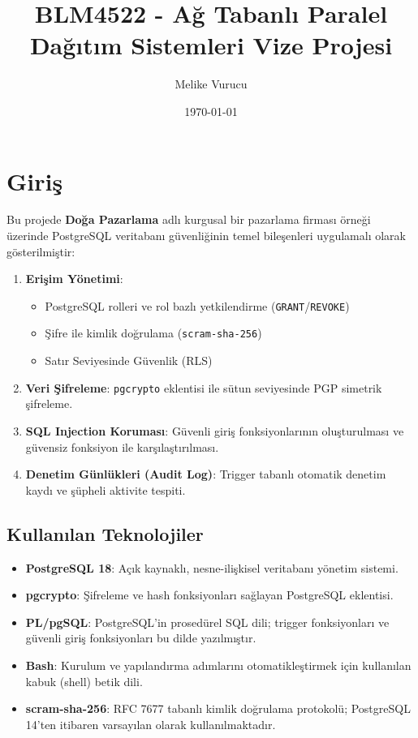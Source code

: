 \documentclass[12pt, a4paper]{report}
\title{BLM4522 - Ağ Tabanlı Paralel Dağıtım Sistemleri Vize Projesi}
\author{Melike Vurucu}
\date{\today}
\begin{document}
\maketitle
\tableofcontents

\chapter{Giriş}

Bu projede \textbf{Doğa Pazarlama} adlı kurgusal bir pazarlama firması örneği üzerinde PostgreSQL veritabanı güvenliğinin temel bileşenleri uygulamalı olarak gösterilmiştir:

\begin{enumerate}
  \item \textbf{Erişim Yönetimi}:
    \begin{itemize}
      \item PostgreSQL rolleri ve rol bazlı yetkilendirme (\texttt{GRANT}/\texttt{REVOKE})
      \item Şifre ile kimlik doğrulama (\texttt{scram-sha-256})
      \item Satır Seviyesinde Güvenlik (RLS)
    \end{itemize}
  \item \textbf{Veri Şifreleme}: \texttt{pgcrypto} eklentisi ile sütun seviyesinde PGP simetrik şifreleme.
  \item \textbf{SQL Injection Koruması}: Güvenli giriş fonksiyonlarının oluşturulması ve güvensiz fonksiyon ile karşılaştırılması.
  \item \textbf{Denetim Günlükleri (Audit Log)}: Trigger tabanlı otomatik denetim kaydı ve şüpheli aktivite tespiti.
\end{enumerate}

\section{Kullanılan Teknolojiler}
\begin{itemize}
  \item \textbf{PostgreSQL 18}: Açık kaynaklı, nesne-ilişkisel veritabanı yönetim sistemi.
  \item \textbf{pgcrypto}: Şifreleme ve hash fonksiyonları sağlayan PostgreSQL eklentisi.
  \item \textbf{PL/pgSQL}: PostgreSQL'in prosedürel SQL dili; trigger fonksiyonları ve güvenli giriş fonksiyonları bu dilde yazılmıştır.
  \item \textbf{Bash}: Kurulum ve yapılandırma adımlarını otomatikleştirmek için kullanılan kabuk (shell) betik dili.
  \item \textbf{scram-sha-256}: RFC 7677 tabanlı kimlik doğrulama protokolü; PostgreSQL 14'ten itibaren varsayılan olarak kullanılmaktadır.
\end{itemize}
\end{document}

